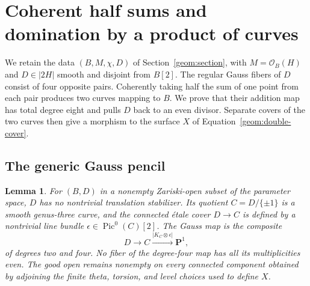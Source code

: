 \documentclass[11pt]{amsart}
\newcommand{\PP}{\mathbf P}
\DeclareMathOperator{\Pic}{Pic}
\newtheorem{lemma}[theorem]{Lemma}
\theoremstyle{definition}
\theoremstyle{remark}
\numberwithin{equation}{section}
\begin{document}
\section{Coherent half sums and domination by a product of curves}
\label{domination:section}

We retain the data $(B,M,\chi,D)$ of Section~\ref{geom:section}, with
$M=\mathcal O_B(H)$ and $D\in|2H|$ smooth and disjoint from $B[2]$.
The regular Gauss fibers of $D$ consist of four opposite pairs.  Coherently
taking half the sum of one point from each pair produces two curves
mapping to $B$.  We prove that their addition map has total degree
eight and pulls $D$ back to an even divisor.  Separate covers of the
two curves then give a morphism to the surface $X$ of
Equation~\eqref{geom:double-cover}.

\subsection{The generic Gauss pencil}

\begin{lemma}\label{geom:gauss-generic}
For $(B,D)$ in a nonempty Zariski-open subset of the parameter space,
$D$ has no nontrivial translation stabilizer.  Its quotient
$C=D/\{\pm1\}$ is a smooth genus-three curve, and the connected
\'{e}tale cover $D\to C$ is defined by a nontrivial line bundle
$\epsilon\in\Pic^0(C)[2]$.  The Gauss map is
the composite
\[
 D\longrightarrow C\xrightarrow{|K_C\otimes\epsilon|}\PP^1,
\]
of degrees two and four.  No fiber of the degree-four map has all its
multiplicities even.  The good open remains nonempty on every
connected component obtained by adjoining the finite theta,
torsion, and level choices used to define $X$.
\end{lemma}
\end{document}
